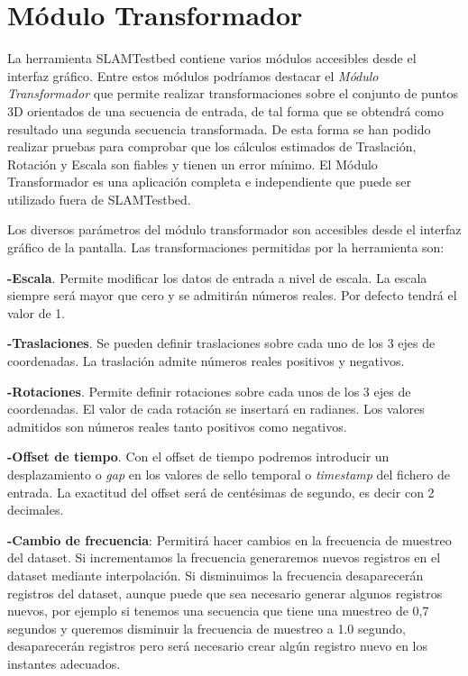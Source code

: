  
\section{Módulo Transformador}
La herramienta SLAMTestbed contiene varios módulos accesibles desde el interfaz gráfico. Entre estos módulos podríamos destacar el \textit{Módulo Transformador} que permite
realizar transformaciones sobre el conjunto de puntos 3D orientados de una secuencia de entrada, de tal forma que se obtendrá como resultado una segunda secuencia transformada. De esta forma se han podido realizar pruebas para comprobar que los cálculos estimados de Traslación, Rotación y Escala son fiables y tienen un error mínimo.
El Módulo Transformador es una aplicación completa e independiente que  puede ser utilizado fuera de SLAMTestbed. 

Los diversos parámetros del módulo transformador son accesibles desde el interfaz gráfico de la pantalla. Las transformaciones permitidas por la herramienta son:

\textbf{-Escala}. Permite modificar los datos de entrada a nivel de escala. La escala siempre será mayor que cero y se admitirán números reales. Por defecto tendrá el valor de 1. 

\textbf{-Traslaciones}. Se pueden definir traslaciones sobre cada uno de los 3 ejes de coordenadas. La traslación admite números reales positivos y negativos.

\textbf{-Rotaciones}. Permite definir rotaciones sobre cada unos de los 3 ejes de coordenadas. El valor de cada rotación se insertará en radianes. Los valores admitidos son números reales tanto positivos como negativos. 

\textbf{-Offset de tiempo}. Con el offset de tiempo podremos introducir un desplazamiento o \textit{gap} en los valores de sello temporal o \textit{timestamp} del fichero de entrada. La exactitud del offset será de centésimas de segundo, es decir con 2 decimales.

\textbf{-Cambio de frecuencia}: Permitirá hacer cambios en la frecuencia de muestreo del dataset. Si incrementamos la frecuencia generaremos nuevos registros en el dataset mediante interpolación. Si disminuimos la frecuencia desaparecerán registros del dataset, aunque puede que sea necesario generar algunos registros nuevos, por ejemplo si tenemos una secuencia que tiene una muestreo de 0,7 segundos y queremos disminuir la frecuencia de muestreo a 1.0 segundo, desaparecerán registros pero será necesario crear algún registro nuevo en los instantes adecuados.


